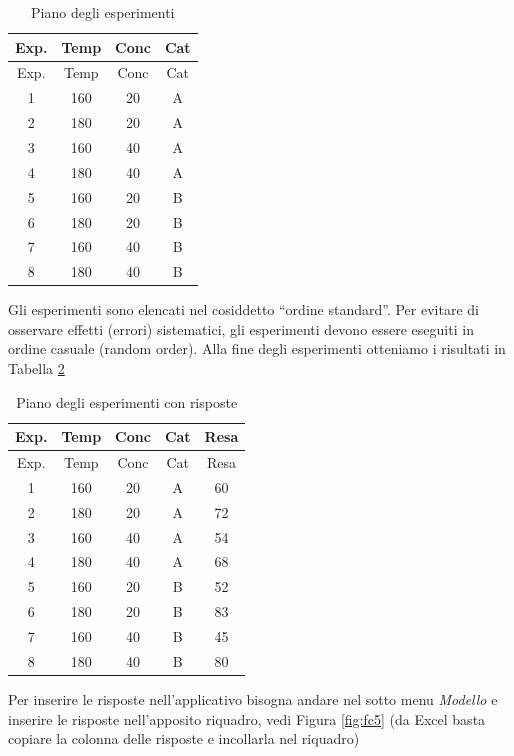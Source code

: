 \documentclass[
  11pt,
]{book}
\begin{document}
\begin{longtable}[]{@{}cccc@{}}
\caption{\label{tab:esperimenti}Piano degli esperimenti}\tabularnewline
\toprule
Exp. & Temp & Conc & Cat \\
\midrule
\endfirsthead
\toprule
Exp. & Temp & Conc & Cat \\
\midrule
\endhead
1 & 160 & 20 & A \\
2 & 180 & 20 & A \\
3 & 160 & 40 & A \\
4 & 180 & 40 & A \\
5 & 160 & 20 & B \\
6 & 180 & 20 & B \\
7 & 160 & 40 & B \\
8 & 180 & 40 & B \\
\bottomrule
\end{longtable}

Gli esperimenti sono elencati nel cosiddetto ``ordine standard''. Per
evitare di osservare effetti (errori) sistematici, gli esperimenti
devono essere eseguiti in ordine casuale (random order). Alla fine degli
esperimenti otteniamo i risultati in Tabella \ref{tab:esperimentir}

\begin{longtable}[]{@{}ccccc@{}}
\caption{\label{tab:esperimentir}Piano degli esperimenti con risposte}\tabularnewline
\toprule
Exp. & Temp & Conc & Cat & Resa \\
\midrule
\endfirsthead
\toprule
Exp. & Temp & Conc & Cat & Resa \\
\midrule
\endhead
1 & 160 & 20 & A & 60 \\
2 & 180 & 20 & A & 72 \\
3 & 160 & 40 & A & 54 \\
4 & 180 & 40 & A & 68 \\
5 & 160 & 20 & B & 52 \\
6 & 180 & 20 & B & 83 \\
7 & 160 & 40 & B & 45 \\
8 & 180 & 40 & B & 80 \\
\bottomrule
\end{longtable}

Per inserire le risposte nell'applicativo bisogna andare nel sotto menu
\emph{Modello} e inserire le risposte nell'apposito riquadro, vedi Figura
\ref{fig:fc5} (da Excel basta copiare la colonna delle risposte e
incollarla nel riquadro)
\end{document}
